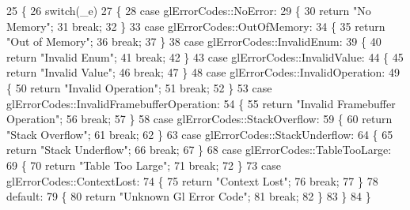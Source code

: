 \begin{DoxyCode}
25 \{
26   \textcolor{keywordflow}{switch}(\_e)
27   \{
28     \textcolor{keywordflow}{case} glErrorCodes::NoError:
29     \{
30       \textcolor{keywordflow}{return} \textcolor{stringliteral}{"No Memory"};
31       \textcolor{keywordflow}{break};
32     \}
33     \textcolor{keywordflow}{case} glErrorCodes::OutOfMemory:
34     \{
35       \textcolor{keywordflow}{return} \textcolor{stringliteral}{"Out of Memory"};
36       \textcolor{keywordflow}{break};
37     \}
38     \textcolor{keywordflow}{case} glErrorCodes::InvalidEnum:
39     \{
40       \textcolor{keywordflow}{return} \textcolor{stringliteral}{"Invalid Enum"};
41       \textcolor{keywordflow}{break};
42     \}
43     \textcolor{keywordflow}{case} glErrorCodes::InvalidValue:
44     \{
45       \textcolor{keywordflow}{return} \textcolor{stringliteral}{"Invalid Value"};
46       \textcolor{keywordflow}{break};
47     \}
48     \textcolor{keywordflow}{case} glErrorCodes::InvalidOperation:
49     \{
50       \textcolor{keywordflow}{return} \textcolor{stringliteral}{"Invalid Operation"};
51       \textcolor{keywordflow}{break};
52     \}
53     \textcolor{keywordflow}{case} glErrorCodes::InvalidFramebufferOperation:
54     \{
55       \textcolor{keywordflow}{return} \textcolor{stringliteral}{"Invalid Framebuffer Operation"};
56       \textcolor{keywordflow}{break};
57     \}
58     \textcolor{keywordflow}{case} glErrorCodes::StackOverflow:
59     \{
60       \textcolor{keywordflow}{return} \textcolor{stringliteral}{"Stack Overflow"};
61       \textcolor{keywordflow}{break};
62     \}
63     \textcolor{keywordflow}{case} glErrorCodes::StackUnderflow:
64     \{
65       \textcolor{keywordflow}{return} \textcolor{stringliteral}{"Stack Underflow"};
66       \textcolor{keywordflow}{break};
67     \}
68     \textcolor{keywordflow}{case} glErrorCodes::TableTooLarge:
69     \{
70       \textcolor{keywordflow}{return} \textcolor{stringliteral}{"Table Too Large"};
71       \textcolor{keywordflow}{break};
72     \}
73     \textcolor{keywordflow}{case} glErrorCodes::ContextLost:
74     \{
75       \textcolor{keywordflow}{return} \textcolor{stringliteral}{"Context Lost"};
76       \textcolor{keywordflow}{break};
77     \}
78     \textcolor{keywordflow}{default}:
79     \{
80       \textcolor{keywordflow}{return} \textcolor{stringliteral}{"Unknown Gl Error Code"};
81       \textcolor{keywordflow}{break};
82     \}
83   \}
84 \}
\end{DoxyCode}
